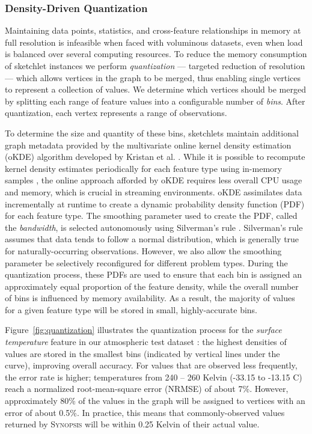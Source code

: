 \subsubsection{Density-Driven Quantization}
Maintaining data points, statistics, and cross-feature relationships in memory at full resolution is infeasible when faced with voluminous datasets, even when load is balanced over several computing resources. To reduce the memory consumption of sketchlet instances we perform \emph{quantization} --- targeted reduction of resolution --- which allows vertices in the graph to be merged, thus enabling single vertices to represent a collection of values. We determine which vertices should be merged by splitting each range of feature values into a configurable number of \emph{bins}. After quantization, each vertex represents a range of observations.

To determine the size and quantity of these bins, sketchlets maintain additional graph metadata provided by the multivariate online kernel density estimation (oKDE) algorithm developed by Kristan et al. \cite{kristan2011multivariate}. While it is possible to recompute kernel density estimates periodically for each feature type using in-memory samples \cite{malensek2013autonomously}, the online approach afforded by oKDE requires less overall CPU usage and memory, which is crucial in streaming environments.  oKDE assimilates data incrementally at runtime to create a dynamic probability density function (PDF) for each feature type. The smoothing parameter used to create the PDF, called the \emph{bandwidth}, is selected autonomously using Silverman's rule \cite{silverman1986density}. Silverman's rule assumes that data tends to follow a normal distribution, which is generally true for naturally-occurring observations. However, we also allow the smoothing parameter be selectively reconfigured for different problem types. During the quantization process, these PDFs are used to ensure that each bin is assigned an approximately equal proportion of the feature density, while the overall number of bins is influenced by memory availability. As a result, the majority of values for a given feature type will be stored in small, highly-accurate bins.

Figure~\ref{fig:quantization} illustrates the quantization process for the \emph{surface temperature} feature in our atmospheric test dataset \cite{noaa_nam}: the highest densities of values are stored in the smallest bins (indicated by vertical lines under the curve), improving overall accuracy. For values that are observed less frequently, the error rate is higher; temperatures from 240 -- 260 Kelvin (-33.15 to -13.15 \degree C) reach a normalized root-mean-square error (NRMSE) of about 7\%. However, approximately 80\% of the values in the graph will be assigned to vertices with an error of about 0.5\%. In practice, this means that commonly-observed values returned by \textsc{Synopsis} will be within 0.25 Kelvin of their actual value.

